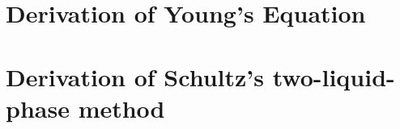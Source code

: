 \documentclass[12pt,letterpaper]{report}
\begin{document}
\newpage
\appendix
\chapter{Derivation of Young's Equation}\label{appendixA}


\chapter{Derivation of Schultz's two-liquid-phase method}\label{appendixB}


\newpage


\end{document}
